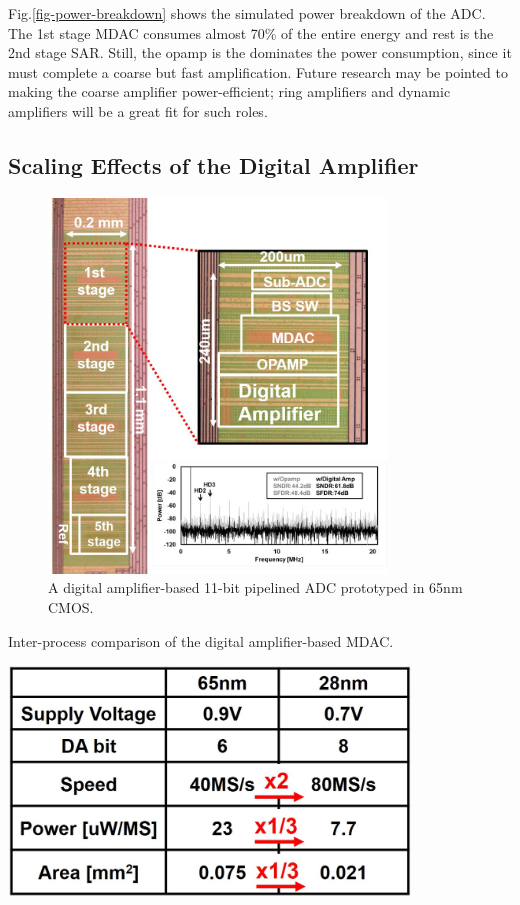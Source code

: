 Fig.\ref{fig-power-breakdown} shows the simulated power breakdown of the ADC. The 1st stage MDAC consumes almost 70\% of the entire energy and rest is the 2nd stage SAR. Still, the opamp is the dominates the power consumption, since it must complete a coarse but fast amplification. Future research may be pointed to making the coarse amplifier power-efficient; ring amplifiers \cite{hershberg2012ring} and dynamic amplifiers \cite{verbruggen20132} will be a great fit for such roles.


\subsection{Scaling Effects of the Digital Amplifier}
\begin{figure}[!]
\centering
  \includegraphics[width=0.8\textwidth]{figure/chap2/65nmchip.jpg}
  \caption{A digital amplifier-based 11-bit pipelined ADC prototyped in 65nm CMOS.}
  \label{fig-65nm}
\end{figure}
\begin{table}[!]
\centering
  \caption{Inter-process comparison of the digital amplifier-based MDAC. }
  \label{tbl:process}
 \includegraphics[width=0.8\textwidth]{figure/chap2/performancecomp.jpg}
\end{table}
